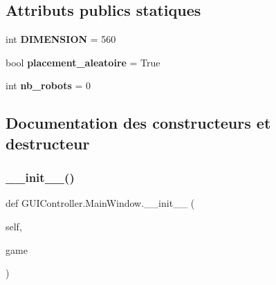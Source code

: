 \subsection*{Attributs publics statiques}
\begin{DoxyCompactItemize}
\item 
\mbox{\label{classGUIController_1_1MainWindow_a7fa4196b6eb55727fc96336094074344}} 
int {\bfseries D\+I\+M\+E\+N\+S\+I\+ON} = 560
\item 
\mbox{\label{classGUIController_1_1MainWindow_af5ea7efeba7ed3f402b593a3549babdf}} 
bool {\bfseries placement\+\_\+aleatoire} = True
\item 
\mbox{\label{classGUIController_1_1MainWindow_a33d85d092e26a11ec3eb92bfcac9a7b2}} 
int {\bfseries nb\+\_\+robots} = 0
\end{DoxyCompactItemize}


\subsection{Documentation des constructeurs et destructeur}
\mbox{\label{classGUIController_1_1MainWindow_a69da336cfb18e8a8fac9b337e970586b}} 
\subsubsection{\texorpdfstring{\+\_\+\+\_\+init\+\_\+\+\_\+()}{\_\_init\_\_()}}
{\footnotesize\ttfamily def G\+U\+I\+Controller.\+Main\+Window.\+\_\+\+\_\+init\+\_\+\+\_\+ (\begin{DoxyParamCaption}\item[{}]{self,  }\item[{}]{game }\end{DoxyParamCaption})}

